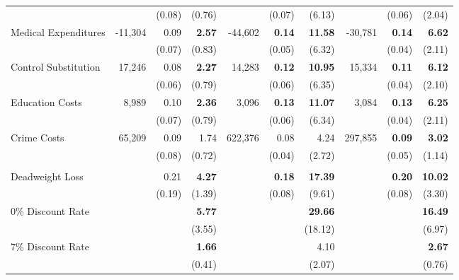\documentclass[static]{JJH-Beamer}
\begin{document}
\begin{frame}[shrink=10]
\begin{table}[H]
\begin{center}
\begin{tabular}{l r r r r r r r r r}
	&		&	(0.08)	&	(0.76)	&		&	(0.07)	&	(6.13)	&		&	(0.06)	&	(2.04)	\\
Medical Expenditures	&	-11,304	&	0.09	&	\textbf{2.57}	&	-44,602	&	\textbf{0.14}	&	\textbf{11.58}	&	-30,781	&	\textbf{0.14}	&	\textbf{6.62}	\\
	&		&	(0.07)	&	(0.83)	&		&	(0.05)	&	(6.32)	&		&	(0.04)	&	(2.11)	\\
Control Substitution	&	17,246	&	0.08	&	\textbf{2.27}	&	14,283	&	\textbf{0.12}	&	\textbf{10.95}	&	15,334	&	\textbf{0.11}	&	\textbf{6.12}	\\
	&		&	(0.06)	&	(0.79)	&		&	(0.06)	&	(6.35)	&		&	(0.04)	&	(2.10)	\\
Education Costs	&	8,989	&	0.10	&	\textbf{2.36}	&	3,096	&	\textbf{0.13}	&	\textbf{11.07}	&	3,084	&	\textbf{0.13}	&	\textbf{6.25}	\\
	&		&	(0.07)	&	(0.79)	&		&	(0.06)	&	(6.34)	&		&	(0.04)	&	(2.11)	\\
Crime Costs	&	65,209	&	0.09	&	1.74	&	622,376	&	0.08	&	4.24	&	297,855	&	\textbf{0.09}	&	\textbf{3.02}	\\
	&		&	(0.08)	&	(0.72)	&		&	(0.04)	&	(2.72)	&		&	(0.05)	&	(1.14)	\\ \\
Deadweight Loss	&		&	0.21	&	\textbf{4.27}	&		&	\textbf{0.18}	&	\textbf{17.39}	&		&	\textbf{0.20}	&	\textbf{10.02}	\\
	&		&	(0.19)	&	(1.39)	&		&	(0.08)	&	(9.61)	&		&	(0.08)	&	(3.30)	\\
0\% Discount Rate	&		&		&	\textbf{5.77}	&		&		&	\textbf{29.66}	&		&		&	\textbf{16.49}	\\
	&		&		&	(3.55)	&		&		&	(18.12)	&		&		&	(6.97)	\\
7\% Discount Rate	&		&		&	\textbf{1.66}	&		&		&	4.10	&		&		&	\textbf{2.67}	\\
	&		&		&	(0.41)	&		&		&	(2.07)	&		&		&	(0.76)	\\
\bottomrule																			
\end{tabular}		
\end{center}
\end{table}

\end{frame}
\end{document}
